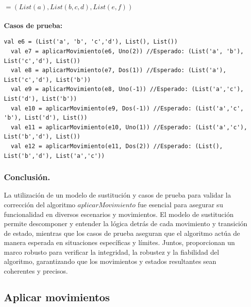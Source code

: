 \documentclass[12pt, a4paper]{article}
\begin{document}
\\ $= (List(a),  List( b, c, d), List(e, f))$
\\ \\
\newpage{}
\textbf{Casos de prueba: } \\
\begin{lstlisting}[caption=Casos de prueba para la funcion aplicarMovimiento, label=lst:scala_code]
  val e6 = (List('a', 'b', 'c','d'), List(), List()) 
  val e7 = aplicarMovimiento(e6, Uno(2)) //Esperado: (List('a', 'b'), List('c','d'), List())
  val e8 = aplicarMovimiento(e7, Dos(1)) //Esperado: (List('a'), List('c','d'), List('b'))
  val e9 = aplicarMovimiento(e8, Uno(-1)) //Esperado: (List('a','c'), List('d'), List('b'))
  val e10 = aplicarMovimiento(e9, Dos(-1)) //Esperado: (List('a','c', 'b'), List('d'), List())
  val e11 = aplicarMovimiento(e10, Uno(1)) //Esperado: (List('a','c'), List('b','d'), List())
  val e12 = aplicarMovimiento(e11, Dos(2)) //Esperado: (List(), List('b','d'), List('a','c'))
  \end{lstlisting}
\subsubsection{Conclusión.}
La utilización de un modelo de sustitución y casos de prueba para validar la corrección del algoritmo $aplicarMovimiento$ fue esencial para asegurar su funcionalidad en diversos escenarios y movimientos. El modelo de sustitución permite descomponer y entender la lógica detrás de cada movimiento y transición de estado, mientras que los casos de prueba aseguran que el algoritmo actúa de manera esperada en situaciones específicas y límites. Juntos, proporcionan un marco robusto para verificar la integridad, la robustez y la fiabilidad del algoritmo, garantizando que los movimientos y estados resultantes sean coherentes y precisos.
\subsection{Aplicar movimientos}
\end{document}
